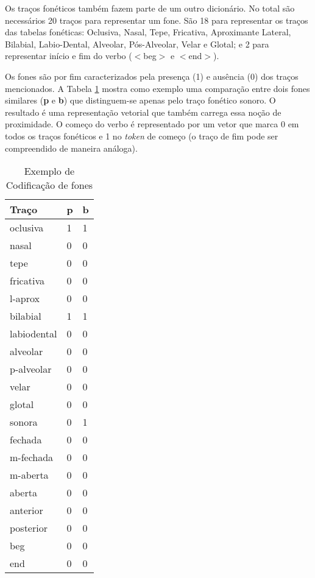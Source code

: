 Os traços fonéticos também fazem parte de um outro dicionário. No total são necessários 20 traços para representar um fone. São 18 para representar os traços das tabelas fonéticas: Oclusiva, Nasal, Tepe, Fricativa, Aproximante Lateral, Bilabial, Labio-Dental, Alveolar, Pós-Alveolar, Velar e Glotal; e 2 para representar início e fim do verbo ($<$beg$>$ e $<$end$>$).

Os fones são por fim caracterizados pela presença (1) e ausência (0) dos traços mencionados.  A Tabela \ref{tab:coding_example} mostra como exemplo uma comparação entre dois fones similares (\textbf{p} e \textbf{b}) que distinguem-se apenas pelo traço fonético sonoro. O resultado é uma representação vetorial que também carrega essa noção de proximidade. O começo do verbo é representado por um vetor que marca 0 em todos os traços fonéticos e 1 no \textit{token} de começo (o traço de fim pode ser compreendido de maneira análoga). 

\begin{table}[H]
\begin{center}
\begin{tabular}{lll}
 Traço & p & b \\
 \toprule
oclusiva & 1 & 1 \\
nasal & 0 & 0 \\
tepe & 0 & 0 \\
fricativa & 0 & 0 \\
l-aprox & 0 & 0 \\
bilabial & 1 & 1 \\
labiodental & 0 & 0 \\
alveolar & 0 & 0 \\
p-alveolar & 0 & 0 \\
velar & 0 & 0 \\
glotal & 0 & 0 \\
sonora & 0 & 1 \\
fechada & 0 & 0 \\
m-fechada & 0 & 0 \\
m-aberta & 0 & 0 \\
aberta & 0 & 0 \\
anterior & 0 & 0 \\
posterior & 0 & 0 \\
\<beg\> & 0 & 0 \\
\<end\> & 0 & 0
\end{tabular}
\end{center}
\caption{Exemplo de Codificação de fones}
\label{tab:coding_example}
\end{table}

